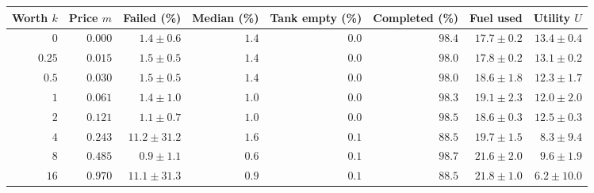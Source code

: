 \begin{tabular}{@{}rrrrrrrr@{}}
\toprule
Worth $k$ & Price $m$ & Failed (\%) & Median (\%) & Tank empty (\%) & Completed (\%) & Fuel used & Utility $U$ \\
\midrule
$0$ & $0.000$ & $1.4\pm0.6$ & $1.4$ & $0.0$ & $98.4$ & $17.7\pm0.2$ & $13.4\pm0.4$ \\
$0.25$ & $0.015$ & $1.5\pm0.5$ & $1.4$ & $0.0$ & $98.0$ & $17.8\pm0.2$ & $13.1\pm0.2$ \\
$0.5$ & $0.030$ & $1.5\pm0.5$ & $1.4$ & $0.0$ & $98.0$ & $18.6\pm1.8$ & $12.3\pm1.7$ \\
$1$ & $0.061$ & $1.4\pm1.0$ & $1.0$ & $0.0$ & $98.3$ & $19.1\pm2.3$ & $12.0\pm2.0$ \\
$2$ & $0.121$ & $1.1\pm0.7$ & $1.0$ & $0.0$ & $98.5$ & $18.6\pm0.3$ & $12.5\pm0.3$ \\
$4$ & $0.243$ & $11.2\pm31.2$ & $1.6$ & $0.1$ & $88.5$ & $19.7\pm1.5$ & $8.3\pm9.4$ \\
$8$ & $0.485$ & $0.9\pm1.1$ & $0.6$ & $0.1$ & $98.7$ & $21.6\pm2.0$ & $9.6\pm1.9$ \\
$16$ & $0.970$ & $11.1\pm31.3$ & $0.9$ & $0.1$ & $88.5$ & $21.8\pm1.0$ & $6.2\pm10.0$ \\
\bottomrule
\end{tabular}
